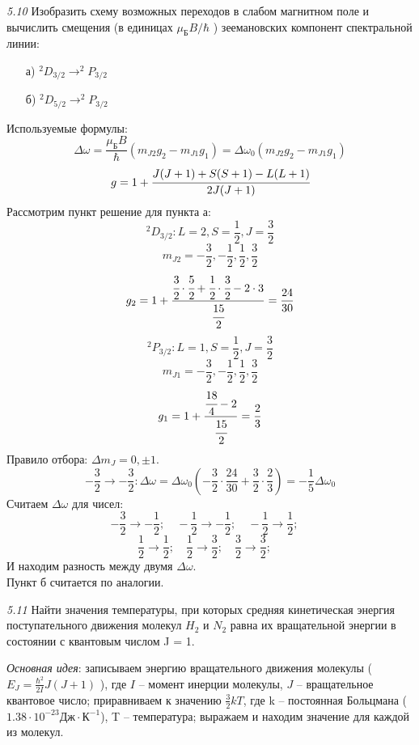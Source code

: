 	\emph{5.10 }
		Изобразить схему возможных переходов в слабом магнитном поле и
		вычислить смещения (в единицах \( \mu_\text{Б}B/\hbar \) ) 
		зеемановских компонент спектральной линии: 
		\vspace*{-1em}
		\begin{itemize}\itemsep-8pt
			\item[а)] \( ^2D_{3/2} \rightarrow ^2P_{3/2} \)
			\item[б)] \( ^2D_{5/2} \rightarrow ^2P_{3/2} \)
		\end{itemize}
		Используемые формулы: 
		\[ 
			\Delta\omega = \frac{\mu_\text{Б}B}{\hbar}(m_{J2}g_2 - m_{J1}g_1)
			= \Delta\omega_0 (m_{J2}g_2 - m_{J1}g_1)
		\]
		\[ g = 1 + \cfrac{J(J+1)+S(S+1)-L(L+1)}{2J(J+1)} \]
		Рассмотрим пункт решение для пункта а:
		\[ ^2D_{3/2}: L=2, S=\frac{1}{2}, J=\frac{3}{2} \]
		\[ m_{J2} = -\frac{3}{2}, -\frac{1}{2}, \frac{1}{2}, \frac{3}{2} \]
		\[ 
			g_2 = 1 + \frac{\cfrac{3}{2}\cdot\cfrac{5}{2} 
			+ \cfrac{1}{2}\cdot\cfrac{3}{2} - 2\cdot3}{\cfrac{15}{2}} 
			= \frac{24}{30}
		\]
		\[ ^2P_{3/2}: L=1, S=\frac{1}{2}, J=\frac{3}{2} \]
		\[ m_{J1} = -\frac{3}{2}, -\frac{1}{2}, \frac{1}{2}, \frac{3}{2} \]
		\[ g_1 = 1 + \frac{\cfrac{18}{4} - 2}{\cfrac{15}{2}} = \frac{2}{3} \]
		Правило отбора: \( \Delta m_J = 0, \pm1 \).
		\[ -\frac{3}{2} \rightarrow -\frac{3}{2}: 
			\Delta\omega = \Delta\omega_0 (-\frac{3}{2}\cdot\frac{24}{30} 
			+ \frac{3}{2}\cdot\frac{2}{3}) = -\frac{1}{5}\Delta\omega_0 
		\]
		Считаем \( \Delta\omega \) для чисел:
		\[ 
			-\frac{3}{2} \rightarrow -\frac{1}{2};\quad
			-\frac{1}{2} \rightarrow -\frac{1}{2};\quad
			-\frac{1}{2} \rightarrow \frac{1}{2};\quad
		\]
		\[ 
			\frac{1}{2} \rightarrow \frac{1}{2};\quad
			\frac{1}{2} \rightarrow \frac{3}{2};\quad
			\frac{3}{2} \rightarrow \frac{3}{2};\quad
		\]
		И находим разность между двумя \( \Delta\omega \). \\
		Пункт б считается по аналогии.

	\emph{5.11 }
		Найти значения температуры, при которых средняя кинетическая энергия
		поступательного движения молекул \( H_2 \) и \( N_2 \) равна их 
		вращательной энергии в состоянии с квантовым числом J = 1.
		\par\emph{Основная идея}: записываем энергию вращательного движения молекулы
		( \( E_J = \frac{\hbar^2}{2I}J(J+1) \) ), где \( I \) -- 
		момент инерции молекулы, \( J \) -- вращательное квантовое число; 
		приравниваем к значению \( \frac{3}{2} kT \), где k -- постоянная Больцмана 
		(\( 1.38\cdot10^{-23} \text{Дж}\cdot\text{К}^{-1} \)), T -- 
		температура; выражаем и находим значение для каждой из молекул.

